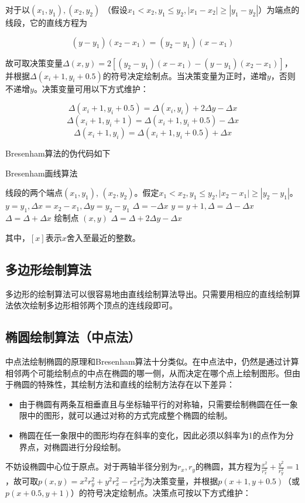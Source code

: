 \documentclass[a4paper,12pt]{article}
\begin{document}
对于以$(x_1, y_1), (x_2, y_2)$ （假设$x_1 < x_2, y_1 \leq y_2, |x_1 - x_2| \geq |y_1 - y_2|$）为端点的线段，它的直线方程为

$$ (y - y_1) (x_2 - x_1) = (y_2 - y_1)(x - x_1) $$

故可取决策变量$\Delta(x, y) = 2[(y_2 - y_1)(x - x_1) - (y - y_1)(x_2 - x_1)]$，并根据$\Delta(x_i+1, y_i+0.5)$的符号决定绘制点。当决策变量为正时，递增$y$，否则不递增$y$。决策变量可用以下方式维护：

$$ \Delta(x_i+1, y_i+0.5) = \Delta(x_i, y_i) + 2\Delta y - \Delta x $$
$$ \Delta(x_i+1, y_i+1) = \Delta(x_i+1, y_i+0.5) - \Delta x $$
$$ \Delta(x_i+1, y_i) = \Delta(x_i+1, y_i+0.5) + \Delta x $$

Bresenham算法的伪代码如下

\begin{algorithm}[htb] 
\caption{Bresenham画线算法} 
\label{alg:DDA} 
\begin{algorithmic}[1] 
\Require 
线段的两个端点$(x_1, y_1)$, $(x_2, y_2)$。假定$x_1 < x_2, y_1 \leq y_2, |x_2 - x_1| \geq |y_2 - y_1|$。
\State $y = y_1, \Delta x = x_2 - x_1, \Delta y = y_2 - y_1$
\State $\Delta = -\Delta x$
	\State $y = y + 1, \Delta = \Delta - \Delta x$ 
	\Else
	\State $\Delta = \Delta + \Delta x$
	\EndIf
    \State 绘制点 $(x, y)$
    \State $\Delta = \Delta + 2\Delta y - \Delta x$
\EndFor
\end{algorithmic} 
\end{algorithm}

其中，$[x]$表示$x$舍入至最近的整数。

\subsection{多边形绘制算法}
多边形的绘制算法可以很容易地由直线绘制算法导出。只需要用相应的直线绘制算法依次绘制多边形相邻两个顶点的连线段即可。


\subsection{椭圆绘制算法（中点法）}
中点法绘制椭圆的原理和Bresenham算法十分类似。在中点法中，仍然是通过计算相邻两个可能绘制点的中点在椭圆的哪一侧，从而决定在哪个点上绘制图形。但由于椭圆的特殊性，其绘制方法和直线的绘制方法存在以下差异：

\begin{itemize}
	\item 由于椭圆有两条互相垂直且与坐标轴平行的对称轴，只需要绘制椭圆在任一象限中的图形，就可以通过对称的方式完成整个椭圆的绘制。
	\item 椭圆在任一象限中的图形均存在斜率的变化，因此必须以斜率为1的点作为分界点，对椭圆进行分段绘制。
\end{itemize}
不妨设椭圆中心位于原点。对于两轴半径分别为$r_x,r_y$的椭圆，其方程为$\frac{x^2}{r_x^2} + \frac{y^2}{r_y^2} = 1$，故可取$p(x, y) = x^2r_y^2 + y^2 r_x^2 - r_x^2r_y^2$为决策变量，并根据$p(x+1, y+0.5)$（或$p(x+0.5, y+1)$）的符号决定绘制点。决策点可按以下方式维护：
\end{document}
